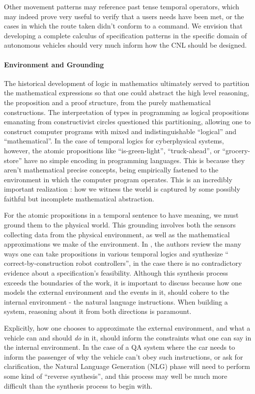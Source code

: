 \documentclass{article}
\begin{document}
Other movement patterns may reference past tense temporal operators, which may
indeed prove very useful to verify that a users needs have been met, or the
cases in which the route taken didn't conform to a command. We envision that
developing a complete calculus of specification patterns in the specific domain
of autonomous vehicles should very much inform how the CNL should be designed.

\paragraph{Environment and Grounding}

The historical development of logic in mathematics ultimately served to
partition the mathematical expressions so that one could abstract the high level
reasoning, the proposition and a proof structure, from the purely mathematical
constructions. The interpretation of types in programming as logical
propositions emanating from constructivist circles questioned this partitioning,
allowing one to construct computer programs with mixed and indistinguishable
``logical'' and ``mathematical''. In the case of temporal logics for
cyberphysical systems, however, the atomic propositions like ``is-green-light'',
``truck-ahead'', or ``grocery-store'' have no simple encoding in programming
languages. This is because they aren't mathematical precise concepts, being
empirically fastened to the environment in which the computer program operates.
This is an incredibly important realization : how we witness the world is
captured by some possibly faithful but incomplete mathematical abstraction.

For the atomic propositions in a temporal sentence to have meaning, we must
ground them to the physical world. This grounding involves both the sensors
collecting data from the physical environment, as well as the mathematical
approximations we make of the environment. In \cite{synthGazit}, the authors
review the many ways one can take propositions in various temporal logics and
synthesize `` correct-by-construction robot controllers'', in the case there is no
contradictory evidence about a specification's feasibility. Although this
synthesis process exceeds the boundaries of the work, it is important to discuss
because how one models the external environment and the events in it, should
cohere to the internal environment - the natural language instructions.
When building a system, reasoning about it from both directions is paramount.

Explicitly, how one chooses to approximate the external environment, and what a
vehicle can and should \emph{do} in it, should inform the constraints what
one can say in the internal environment. In the case of a QA system where the
car needs to inform the passenger of why the vehicle can't obey such
instructions, or ask for clarification, the Natural Language Generation (NLG)
phase will need to perform some kind of ``reverse synthesis'', and this process
may well be much more difficult than the synthesis process to begin with.
\end{document}
